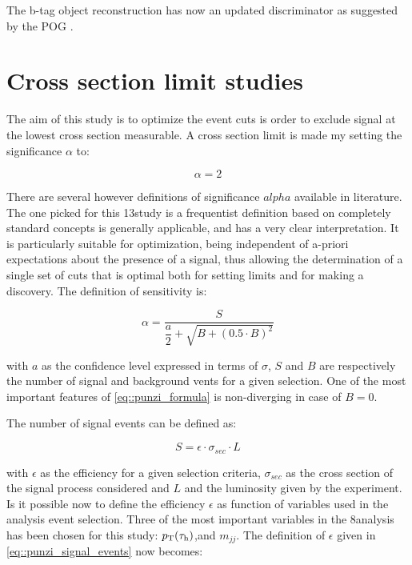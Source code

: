 The b-tag object reconstruction has now an updated discriminator as suggested by the POG \cite{bib:BJetID_13tev}.

\section{Cross section limit studies}

The aim of this study is to optimize the event cuts is order to exclude signal at the lowest cross section measurable. A cross section limit is made my setting the significance $\alpha$ to:

\begin{equation}
\alpha = 2
\label{eq::significance_xsec_limit}
\end{equation}

There are several however definitions of significance $alpha$ available in literature. The one picked for this 13\tev study is a frequentist definition based on completely standard concepts\cite{Punzi:2003bu} is generally applicable, and has a very clear interpretation. It is particularly suitable for optimization, being independent of a-priori expectations about the presence of a signal, thus allowing the determination of a single set of cuts that is optimal both for setting limits and for making a discovery. The definition of sensitivity is:

\begin{equation}
\alpha = \dfrac{S}{\dfrac{a}{2} + \sqrt{B + (0.5 \cdot B)^{2}}}
\label{eq::punzi_formula}
\end{equation}

with $a$ as the confidence level expressed in terms of $\sigma$, $S$ and $B$ are respectively the number of signal and background vents for a given selection. One of the most important features of \autoref{eq::punzi_formula} is non-diverging in case of $B = 0$.

The number of signal events can be defined as:

\begin{equation}
S = \epsilon \cdot \sigma_{sec} \cdot L
\label{eq::punzi_signal_events}
\end{equation}

with $\epsilon$ as the efficiency for a given selection criteria, $\sigma_{sec}$ as the cross section of the signal process considered and $L$ and the luminosity given by the experiment. Is it possible now to define the efficiency $\epsilon$ as function of variables used in the analysis event selection. Three of the most important variables in the 8\tev analysis has been chosen for this study: $p_{\text{T}}(\tau_{\text{h}})$,\met and $m_{jj}$. The definition of $\epsilon$ given in \autoref{eq::punzi_signal_events} now becomes:

